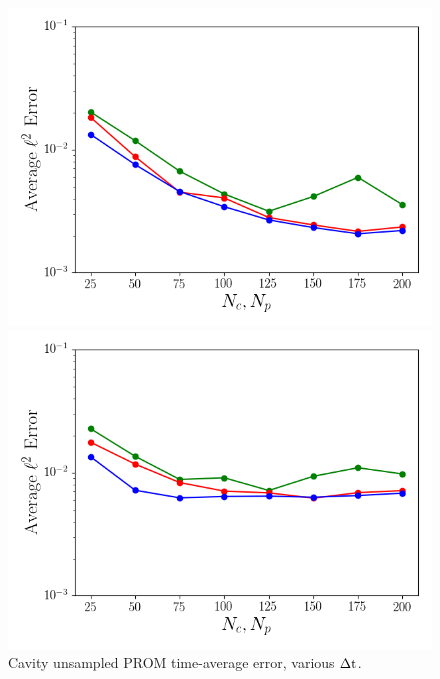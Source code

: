 \begin{figure}
	\begin{minipage}{0.49\linewidth}
		\includegraphics[width=0.99\linewidth]{Chapters/HPROMResults/Images/cavity/unsampled/unsampled_dt5e-6_Average_errorRaw.png}
		\subcaption{\label{fig:cavityUnsampledROMErrVsModesDt5en6}$\dt = 5 \times \dtFOM$}
	\end{minipage}
	\begin{minipage}{0.49\linewidth}
		\includegraphics[width=0.99\linewidth]{Chapters/HPROMResults/Images/cavity/unsampled/unsampled_dt1e-5_Average_errorRaw.png}
		\subcaption{$\dt = 10 \times \dtFOM$}
	\end{minipage}
	\caption{\label{fig:cavityUnsampledROMErrVsModes}Cavity unsampled PROM time-average error, various $\Delta \text{t}$.}
\end{figure}

